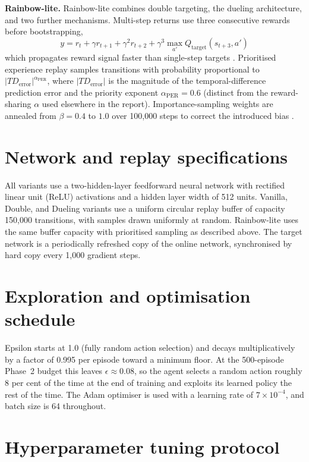 \begin{appendices}
\textbf{Rainbow-lite.} Rainbow-lite combines double targeting, the dueling architecture, and two further mechanisms. Multi-step returns use three consecutive rewards before bootstrapping,
\[
y = r_t + \gamma r_{t+1} + \gamma^2 r_{t+2} + \gamma^3 \max_{a'} Q_{\text{target}}(s_{t+3}, a')
\]
which propagates reward signal faster than single-step targets \citep{hessel2018rainbow}. Prioritised experience replay samples transitions with probability proportional to $|TD_{\text{error}}|^{\alpha_{\text{PER}}}$, where $|TD_{\text{error}}|$ is the magnitude of the temporal-difference prediction error and the priority exponent $\alpha_{\text{PER}} = 0.6$ (distinct from the reward-sharing $\alpha$ used elsewhere in the report). Importance-sampling weights are annealed from $\beta = 0.4$ to $1.0$ over 100{,}000 steps to correct the introduced bias \citep{schaul2016prioritized}.

\section{Network and replay specifications}

All variants use a two-hidden-layer feedforward neural network with rectified linear unit (ReLU) activations and a hidden layer width of 512 units. Vanilla, Double, and Dueling variants use a uniform circular replay buffer of capacity 150{,}000 transitions, with samples drawn uniformly at random. Rainbow-lite uses the same buffer capacity with prioritised sampling as described above. The target network is a periodically refreshed copy of the online network, synchronised by hard copy every 1{,}000 gradient steps.

\section{Exploration and optimisation schedule}

Epsilon starts at 1.0 (fully random action selection) and decays multiplicatively by a factor of 0.995 per episode toward a minimum floor. At the 500-episode Phase~2 budget this leaves $\epsilon \approx 0.08$, so the agent selects a random action roughly 8 per cent of the time at the end of training and exploits its learned policy the rest of the time. The Adam optimiser is used with a learning rate of $7 \times 10^{-4}$, and batch size is 64 throughout.

\section{Hyperparameter tuning protocol}


\end{appendices}

